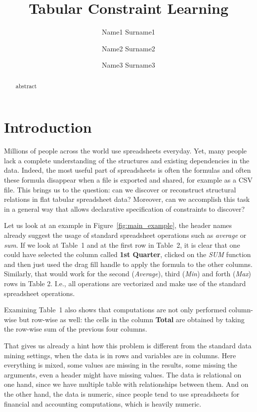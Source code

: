 \documentclass{ecai}
\begin{document}
\title{Tabular Constraint Learning}

\author{Name1 Surname1 \and Name2 Surname2 \and Name3 Surname3  }

\maketitle

\begin{abstract}
  abstract
\end{abstract}

\section{Introduction}
Millions of people across the world use spreadsheets everyday.
Yet, many people lack a complete understanding of the structures and existing dependencies in the data.
Indeed, the most useful part of spreadsheets is often the formulas and often these formula disappear when a file is exported and shared, for example as a CSV file.
This brings us to the question: can we discover or reconstruct structural relations in flat tabular spreadsheet data?
Moreover, can we accomplish this task in a general way that allows declarative specification of constraints to discover?


Let us look at an example in Figure~\ref{fig:main_example}, the header names already suggest the usage of standard spreadsheet operations such as \textit{average} or \textit{sum}.
If we look at Table~1 and at the first row in Table~2, it is clear that one could have selected the column called \textbf{1st Quarter}, clicked on the \textit{SUM} function and then just used the drag fill handle to apply the formula to the other columns.
Similarly, that would work for the second (\textit{Average}), third (\textit{Min})  and forth (\textit{Max}) rows in Table 2.
I.e., all operations are vectorized and make use of the standard spreadsheet operations.

Examining Table~1 also shows that computations are not only performed column-wise but row-wise as well: the cells in the column \textbf{Total} are obtained by taking the row-wise sum of the previous four columns.

That gives us already a hint how this problem is different from the standard data mining settings, when the data is in rows and variables are in columns. Here everything is mixed, some values are missing in the results, some missing the arguments, even a header might have missing values. The data is relational on one hand, since we have multiple table with relationships between them. And on the other hand, the data is numeric, since people tend to use spreadsheets for financial and accounting computations, which is heavily numeric.
\end{document}
